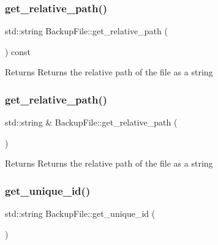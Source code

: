 \subsubsection{\texorpdfstring{get\+\_\+relative\+\_\+path()}{get\_relative\_path()}\hspace{0.1cm}{\footnotesize\ttfamily [1/2]}}
{\footnotesize\ttfamily std\+::string Backup\+File\+::get\+\_\+relative\+\_\+path (\begin{DoxyParamCaption}{ }\end{DoxyParamCaption}) const}

\begin{DoxyReturn}{Returns}
Returns the relative path of the file as a string 
\end{DoxyReturn}
\mbox{\label{class_backup_1_1_file_1_1_backup_file_ac121d19028b1b5e95736e4416c73d6e3}} 
\subsubsection{\texorpdfstring{get\+\_\+relative\+\_\+path()}{get\_relative\_path()}\hspace{0.1cm}{\footnotesize\ttfamily [2/2]}}
{\footnotesize\ttfamily std\+::string \& Backup\+File\+::get\+\_\+relative\+\_\+path (\begin{DoxyParamCaption}{ }\end{DoxyParamCaption})}

\begin{DoxyReturn}{Returns}
Returns the relative path of the file as a string 
\end{DoxyReturn}
\mbox{\label{class_backup_1_1_file_1_1_backup_file_adc5feacc7ab47c0761b807c389bdef86}} 
\subsubsection{\texorpdfstring{get\+\_\+unique\+\_\+id()}{get\_unique\_id()}}
{\footnotesize\ttfamily std\+::string Backup\+File\+::get\+\_\+unique\+\_\+id (\begin{DoxyParamCaption}{ }\end{DoxyParamCaption})}

